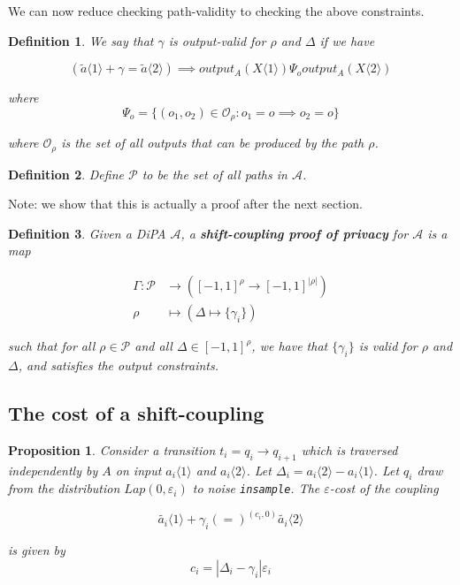 \documentclass{article}
\newtheorem{proposition}{Proposition}[section]
\newtheorem{definition}{Definition}[section]
\renewcommand{\epsilon}{\varepsilon}
\newcommand{\1}{\langle 1 \rangle}
\newcommand{\2}{\langle 2 \rangle}
\begin{document}
We can now reduce checking path-validity to checking the above constraints. 

\begin{definition}
    We say that $\gamma$ is output-valid for $\rho$ and $\Delta$ if we have 

    \[(\tilde{a} \1 + \gamma = \tilde{a} \2) \implies output_A(X \1) \Psi_o output_A(X \2)\]

    where \[\Psi_o = \{(o_1, o_2) \in \mathcal{O}_\rho : o_1 = o \implies o_2 = o\}\]

    where $\mathcal{O}_\rho$ is the set of all outputs that can be produced by the path $\rho$.
\end{definition}

\begin{definition}
    Define $\mathcal{P}$ to be the set of all paths in $\mathcal{A}$.
\end{definition}

Note: we show that this is actually a proof after the next section. 

\begin{definition}
    Given a DiPA $\mathcal{A}$, a \textbf{shift-coupling proof of privacy} for $\mathcal{A}$ is a map 

    \begin{align*}
        \Gamma: \mathcal{P} &\to ([-1, 1]^{\rho} \to [-1, 1]^{|\rho|})\\
        \rho &\mapsto (\Delta \mapsto \{\gamma_i\})
    \end{align*}

    such that for all $\rho \in \mathcal{P}$ and all $\Delta \in [-1, 1]^{\rho}$, we have that $\{\gamma_i\}$ is valid for $\rho$ and $\Delta$, and satisfies the output constraints.
\end{definition}

\subsection{The cost of a shift-coupling}

\begin{proposition}
    Consider a transition $t_i = q_{i} \to q_{i + 1}$ which is traversed independently by $A$ on input $a_i \1$ and $a_i \2$. Let $\Delta_i = a_i \2 - a_i \1$. Let $q_i$ draw from the distribution $Lap(0, \epsilon_i)$ to noise \texttt{insample}. The $\epsilon$-cost of the coupling 

    \[\tilde{a_i} \1 + \gamma_i (=)^{(c_i, 0)} \tilde{a_i} \2\]

    is given by \[c_i = |\Delta_i - \gamma_i| \epsilon_i \]
\end{proposition} 
\end{document}
